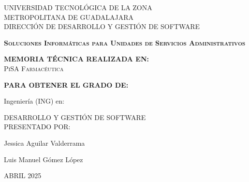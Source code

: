 \documentclass[12pt,letterpaper,spanish, xcolor=table]{report}
\numberwithin{figure}{subsection}
\begin{document}
\thispagestyle{empty}


\begin{center}
	
 \begin{minipage}[b]{.9\linewidth}
	\begin{center}
		\vspace{0.2in}
		\large{UNIVERSIDAD TECNOLÓGICA DE LA ZONA \\METROPOLITANA DE GUADALAJARA}\\
		\large{DIRECCIÓN DE DESARROLLO Y GESTIÓN DE SOFTWARE}\\
	\end{center}
\end{minipage}
\vspace{0.3in}



\centerline{\hbox{}}

\LARGE{\textbf{\textsc{ Soluciones Informáticas para Unidades de Servicios Administrativos}} }

\vspace{0.3in}
\large{\textbf{MEMORIA TÉCNICA REALIZADA EN:}}
 \\ \textsc{PiSA Farmacéutica}
		
\vspace{0.2in}
\large{\textbf{PARA OBTENER EL GRADO DE:}}

\large{Ingeniería (ING) en:}

\large{DESARROLLO Y GESTIÓN DE SOFTWARE}
\\

\vspace{0.2in}
\large{PRESENTADO POR:}


\textsc{} Jessica Aguilar Valderrama %

\textsc{} Luis Manuel Gómez López

\vspace{0.3in}
\small{ ABRIL 2025}
\end{center}


\newpage



		\thispagestyle{empty}
		
\end{document}
